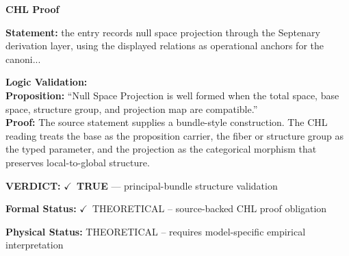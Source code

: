 \vspace{0.45em}
\noindent\textbf{CHL Proof}\par
\textbf{Statement:} the entry records null space projection through the Septenary derivation layer, using
the displayed relations as operational anchors for the canoni...

\textbf{Logic Validation:}\\
\textbf{Proposition:} ``Null Space Projection is well formed when the total space, base space, structure group,
and projection map are compatible.''\\
\textbf{Proof:} The source statement supplies a bundle-style construction. The CHL reading treats the
base as the proposition carrier, the fiber or structure group as the typed parameter,
and the projection as the categorical morphism that preserves local-to-global structure.

\textbf{VERDICT:} \ensuremath{\checkmark}\ \textbf{TRUE} --- principal-bundle structure validation

\textbf{Formal Status:} \ensuremath{\checkmark}\ THEORETICAL -- source-backed CHL proof obligation

\textbf{Physical Status:} THEORETICAL -- requires model-specific empirical interpretation
\par\vspace{0.45em}
\par
\ifTZPDarkEdition
{}
\fi
\endgroup
\endgroup
